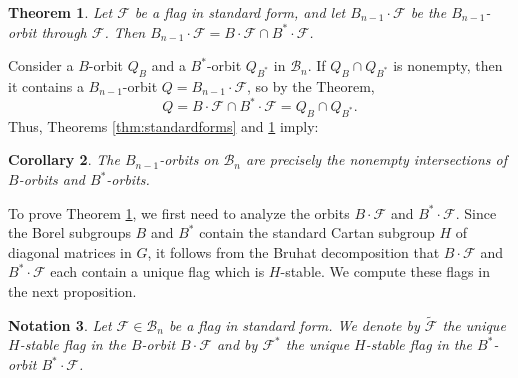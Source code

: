 \documentclass[12pt]{amsart}
\numberwithin{equation}{section}
\newtheorem{thm}{Theorem}[section]
\newtheorem{cor}[thm]{Corollary}
\newtheorem{nota}[thm]{Notation}
\newcommand{\B}{\mathcal{B}}
\newcommand{\F}{\mathcal{F}}
\begin{document}
\begin{thm}\label{thm:orbitsintersect}
Let $\F$ be a flag in standard form, and let $B_{n-1}\cdot\F$ be the $B_{n-1}$-orbit through $\F$. Then $B_{n-1}\cdot \F=B\cdot \F\cap B^{*}\cdot \F $.  
\end{thm}

\noindent Consider a $B$-orbit $Q_B$ and a $B^*$-orbit $Q_{B^*}$ in $\B_n$.
If $Q_B \cap Q_{B^*}$ is nonempty, then it contains a $B_{n-1}$-orbit $Q=B_{n-1}\cdot\F$, so by the Theorem, 
\begin{equation}\label{eq:intersection}
Q=B\cdot \F \cap B^*\cdot \F = Q_B \cap Q_{B^*}.
\end{equation} 
Thus, Theorems \ref{thm:standardforms} and \ref{thm:orbitsintersect} imply:  

\begin{cor}\label{c:intersect}
The $B_{n-1}$-orbits on $\B_{n}$ are precisely the nonempty intersections of $B$-orbits and $B^{*}$-orbits.  
\end{cor}


To prove Theorem \ref{thm:orbitsintersect}, we first need to analyze the orbits $B\cdot \F$ and
$B^{*}\cdot \F$.  Since the Borel subgroups $B$ and $B^{*}$ contain the standard Cartan subgroup $H$ of diagonal matrices in $G$, it follows from the Bruhat decomposition that $B\cdot\F$ and $B^{*}\cdot\F$ each contain a unique flag which is $H$-stable.  We compute these flags in the next proposition.  
\begin{nota}\label{n:tildeandstarflags}
Let $\F\in\B_{n}$ be a flag in standard form.  We denote by $\tilde{\F}$ the unique $H$-stable flag in the $B$-orbit $B\cdot \F$ and
by $\F^{*}$ the unique $H$-stable flag in the $B^{*}$-orbit $B^{*}\cdot \F$.
\end{nota}
%
 
\end{document}
